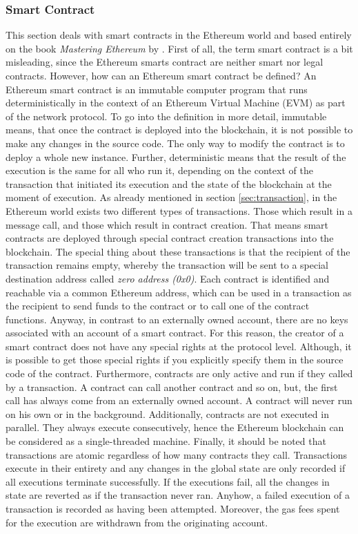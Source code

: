 \subsubsection{Smart Contract}
\label{sec:smart_contract}
This section deals with smart contracts in the Ethereum world and based 
entirely on the book \textit{Mastering Ethereum} by .
First of all, the term smart contract is a bit misleading, since the Ethereum smarts contract 
are neither smart nor legal contracts. However, how can an Ethereum smart contract be defined?
An Ethereum smart contract is an immutable computer program that runs deterministically in the context of an
Ethereum Virtual Machine (EVM) as part of the network protocol. To go into the definition in more detail, 
immutable means, that once the contract is deployed into the blockchain, it is not possible to make any
changes in the source code. The only way to modify the contract is to deploy a whole new instance. 
Further, deterministic means that the result of the execution is the same for all who run it, 
depending on the context of the transaction that initiated its execution and the state of the blockchain
at the moment of execution.
As already mentioned in section \ref{sec:transaction}, in the Ethereum world exists two different types of transactions.
Those which result in a message call, and those which result in contract creation. 
That means smart contracts are deployed through special contract creation transactions into the blockchain. 
The special thing about these transactions is that the recipient of the transaction remains empty, whereby the transaction
will be sent to a special destination address called \textit{zero address (0x0)}. Each contract is identified and reachable via
a common Ethereum address, which can be used in a transaction as the recipient to send funds to the contract or to call 
one of the contract functions. Anyway, in contrast to an externally owned account, there are no keys associated with 
an account of a smart contract. For this reason, the creator of a smart contract does not have any special rights at the 
protocol level. Although, it is possible to get those special rights if you explicitly 
specify them in the source code of the contract.
Furthermore, contracts are only active and run if they called by a transaction. 
A contract can call another contract and so on, but, 
the first call has always come from an externally owned account. 
A contract will never run on his own or in the background. Additionally, contracts are not executed in parallel.
They always execute consecutively, hence the Ethereum blockchain can be considered as a single-threaded machine. 
Finally, it should be noted that transactions are atomic regardless of how many contracts they call. Transactions execute in
their entirety and any changes in the global state are only recorded if all executions terminate successfully. 
If the executions fail, all the changes in state are reverted as if the transaction never ran. Anyhow, a failed
execution of a transaction is recorded as having been attempted. Moreover, the gas fees spent for the execution are withdrawn
from the originating account.

\clearpage